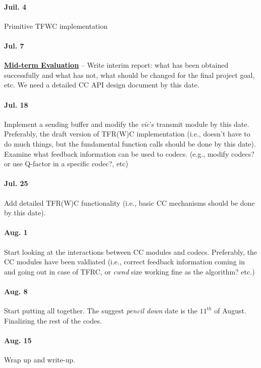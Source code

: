 \paragraph{\textsf{Juil. 4}} Primitive TFWC implementation

\paragraph{\textsf{Jul. 7}} \underline{\textbf{Mid-term Evaluation}} -- Write
interim report: what has been obtained successfully and what has not, what
should be changed for the final project goal, etc. We need a detailed CC API
design document by this date.

\paragraph{\textsf{Jul. 18}} Implement a sending buffer and modify the
\emph{vic}'s transmit module by this date. Preferably, the draft version of
TFR(W)C implementation (i.e., doesn't have to do much things, but the
fundamental function calls should be done by this date).  Examine what feedback
information can be used to codecs.  (e.g., modify codecs?  or use Q-factor in a
specific codec?, etc)

\paragraph{\textsf{Jul. 25}} Add detailed TFR(W)C functionality (i.e., basic CC
mechanisms should be done by this date).

\paragraph{\textsf{Aug. 1}} Start looking at the interactions between CC modules
and codecs. Preferably, the CC modules have been valdiated (i.e., correct
feedback information coming in and going out in case of TFRC, or \emph{cwnd}
size working fine as the algorithm? etc.)

\paragraph{\textsf{Aug. 8}} Start putting all together. The suggest \emph{pencil
down} date is the $11^{th}$ of August. Finalizing the rest of the codes.

\paragraph{\textsf{Aug. 15}} Wrap up and write-up.

